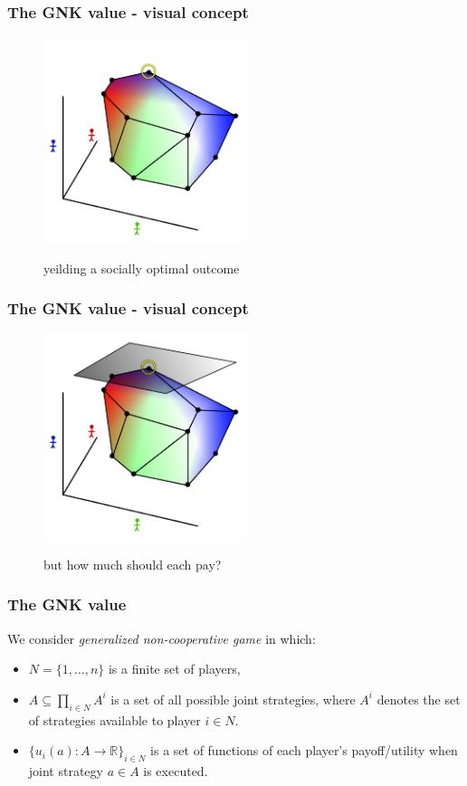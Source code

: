 \begin{frame} \frametitle{The GNK value - visual concept} \begin{figure} \begin{center} \includegraphics[height=6cm]{figs/pp9} \end{center} yeilding a socially optimal outcome \end{figure} \end{frame}
\begin{frame} \frametitle{The GNK value - visual concept} \begin{figure} \begin{center} \includegraphics[height=6cm]{figs/pp10} \end{center} but how much should each pay? \end{figure} \end{frame}



\begin{frame}
\frametitle{The GNK value}
We consider \textit{generalized non-cooperative game} in which:
\begin{itemize}
\item	$N=\{1,\dots,n\}$ is a finite set of players,
\item	$A\subseteq \prod_{i\in N}A^i$ is a set of all possible joint strategies, where $A^i$ denotes the set of strategies available to player $i\in N$.
\item	$\{u_i(a) : A\rightarrow \mathbb{R}\}_{i\in N}$ is a set of functions of each player's payoff/utility when joint strategy $a\in A$ is executed.
\end{itemize}
\end{frame}


